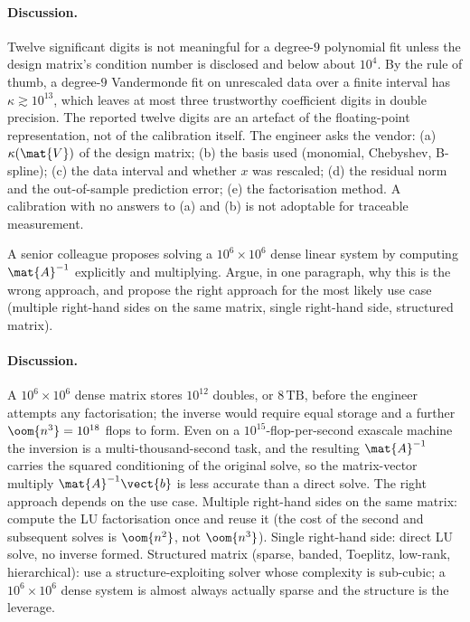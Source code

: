 \paragraph{Discussion.}
Twelve significant digits is not meaningful for a degree-$9$
polynomial fit unless the design matrix's condition number is
disclosed and below about $10^{4}$. By the rule of thumb, a
degree-$9$ Vandermonde fit on unrescaled data over a finite
interval has $\kappa \gtrsim 10^{13}$, which leaves at most three
trustworthy coefficient digits in double precision. The reported
twelve digits are an artefact of the floating-point representation,
not of the calibration itself. The engineer asks the vendor: (a)
$\kappa(\mat{V})$ of the design matrix; (b) the basis used
(monomial, Chebyshev, B-spline); (c) the data interval and whether
$x$ was rescaled; (d) the residual norm and the out-of-sample
prediction error; (e) the factorisation method. A calibration with
no answers to (a) and (b) is not adoptable for traceable
measurement.

\begin{exercise}
A senior colleague proposes solving a $10^{6} \times 10^{6}$ dense
linear system by computing $\mat{A}^{-1}$ explicitly and
multiplying. Argue, in one paragraph, why this is the wrong
approach, and propose the right approach for the most likely use
case (multiple right-hand sides on the same matrix, single
right-hand side, structured matrix).
\end{exercise}

\paragraph{Discussion.}
A $10^{6} \times 10^{6}$ dense matrix stores $10^{12}$ doubles, or
$8 \,\text{TB}$, before the engineer attempts any factorisation;
the inverse would require equal storage and a further $\oom{n^{3}}
= 10^{18}$ flops to form. Even on a $10^{15}$-flop-per-second
exascale machine the inversion is a multi-thousand-second task,
and the resulting $\mat{A}^{-1}$ carries the squared conditioning
of the original solve, so the matrix-vector multiply $\mat{A}^{-1}
\vect{b}$ is less accurate than a direct solve. The right approach
depends on the use case. Multiple right-hand sides on the same
matrix: compute the LU factorisation once and reuse it (the cost
of the second and subsequent solves is $\oom{n^{2}}$, not $\oom{n^{3}}$).
Single right-hand side: direct LU solve, no inverse formed.
Structured matrix (sparse, banded, Toeplitz, low-rank, hierarchical):
use a structure-exploiting solver whose complexity is sub-cubic;
a $10^{6} \times 10^{6}$ dense system is almost always actually
sparse and the structure is the leverage.

